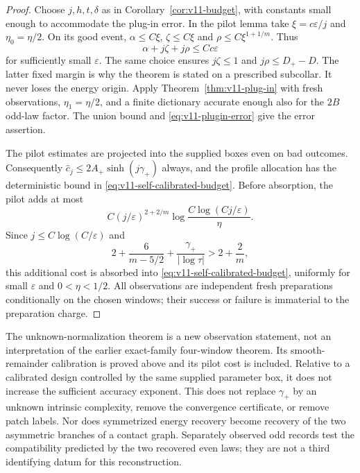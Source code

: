 \begin{proof}
Choose $j,h,t,\delta$ as in Corollary~\ref{cor:v11-budget}, with
constants small enough to accommodate the plug-in error. In the pilot
lemma take $\xi=c\varepsilon/j$ and $\eta_0=\eta/2$.
On its good event, $\alpha\le C\xi$, $\zeta\le C\xi$ and
$\rho\le C\xi^{1+1/m}$. Thus
\[
 \alpha+j\zeta+j\rho\le Cc\varepsilon
\]
for sufficiently small $\varepsilon$. The same choice ensures
$j\zeta\le1$ and $j\rho\le D_+-D$. The latter fixed margin is
why the theorem is stated on a prescribed subcollar. It never loses
the energy origin. Apply Theorem~\ref{thm:v11-plug-in} with fresh
observations, $\eta_1=\eta/2$, and a finite dictionary accurate
enough also for the $2B$ odd-law factor. The union bound and
\eqref{eq:v11-plugin-error} give the error assertion.

The pilot estimates are projected into the supplied boxes even on
bad outcomes. Consequently
$\widehat c_j\le2A_+\sinh(j\gamma_+)$ always, and the profile
allocation has the deterministic bound in
\eqref{eq:v11-self-calibrated-budget}. Before absorption, the pilot
adds at most
\[
 C(j/\varepsilon)^{2+2/m}
               \log\frac{C\log(Cj/\varepsilon)}{\eta}.
\]
Since $j\le C\log(C/\varepsilon)$ and
\[
 2+\frac6{m-5/2}+\frac{\gamma_+}{|\log\tau|}>2+\frac2m,
\]
this additional cost is absorbed into
\eqref{eq:v11-self-calibrated-budget}, uniformly for small
$\varepsilon$ and $0<\eta<1/2$. All observations are independent
fresh preparations conditionally on the chosen windows; their success
or failure is immaterial to the preparation charge.
\end{proof}

The unknown-normalization theorem is a new observation statement, not
an interpretation of the earlier exact-family four-window theorem.
Its smooth-remainder calibration is proved above and its pilot cost is
included. Relative to a calibrated design controlled by the same
supplied parameter box, it does not increase the sufficient accuracy
exponent. This does not replace $\gamma_+$ by an unknown intrinsic
complexity, remove the convergence certificate, or remove patch
labels. Nor does symmetrized energy recovery become recovery of the
two asymmetric branches of a contact graph. Separately observed odd
records test the compatibility predicted by the two recovered even
laws; they are not a third identifying datum for this reconstruction.
